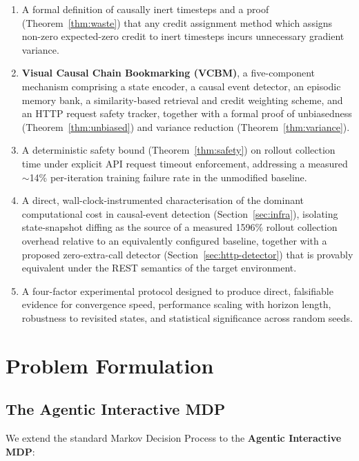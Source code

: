 \documentclass[11pt]{article}
\begin{document}
\begin{enumerate}
\item A formal definition of causally inert timesteps and a proof
(Theorem~\ref{thm:waste}) that any credit assignment method which assigns
non-zero expected-zero credit to inert timesteps incurs unnecessary gradient
variance.
\item \textbf{Visual Causal Chain Bookmarking (VCBM)}, a five-component
mechanism comprising a state encoder, a causal event detector, an episodic
memory bank, a similarity-based retrieval and credit weighting scheme, and an
HTTP request safety tracker, together with a formal proof of unbiasedness
(Theorem~\ref{thm:unbiased}) and variance reduction (Theorem~\ref{thm:variance}).
\item A deterministic safety bound (Theorem~\ref{thm:safety}) on rollout
collection time under explicit API request timeout enforcement, addressing a
measured $\sim$14\% per-iteration training failure rate in the unmodified
baseline.
\item A direct, wall-clock-instrumented characterisation of the dominant
computational cost in causal-event detection (Section~\ref{sec:infra}),
isolating state-snapshot diffing as the source of a measured 1596\% rollout
collection overhead relative to an equivalently configured baseline, together
with a proposed zero-extra-call detector (Section~\ref{sec:http-detector})
that is provably equivalent under the REST semantics of the target
environment.
\item A four-factor experimental protocol designed to produce direct,
falsifiable evidence for convergence speed, performance scaling with horizon
length, robustness to revisited states, and statistical significance across
random seeds.
\end{enumerate}

\section{Problem Formulation}

\subsection{The Agentic Interactive MDP}

We extend the standard Markov Decision Process to the \textbf{Agentic
Interactive MDP}:
\end{document}

